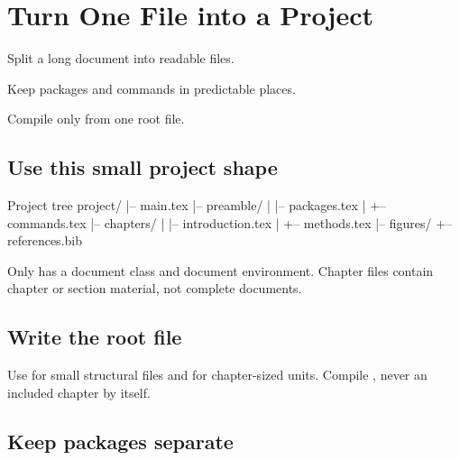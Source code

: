 \chapter{Turn One File into a Project}
\label{chap:long}

\begin{learningoutcomes}
  \item Split a long document into readable files.
  \item Keep packages and commands in predictable places.
  \item Compile only from one root file.
\end{learningoutcomes}

\section{Use this small project shape}

\begin{terminalcode}{Project tree}
project/
|-- main.tex
|-- preamble/
|   |-- packages.tex
|   +-- commands.tex
|-- chapters/
|   |-- introduction.tex
|   +-- methods.tex
|-- figures/
+-- references.bib
\end{terminalcode}

Only  has a document class and document environment. Chapter
files contain chapter or section material, not complete documents.

\section{Write the root file}


Use  for small structural files and  for chapter-sized
units. Compile , never an included chapter by itself.

\section{Keep packages separate}

